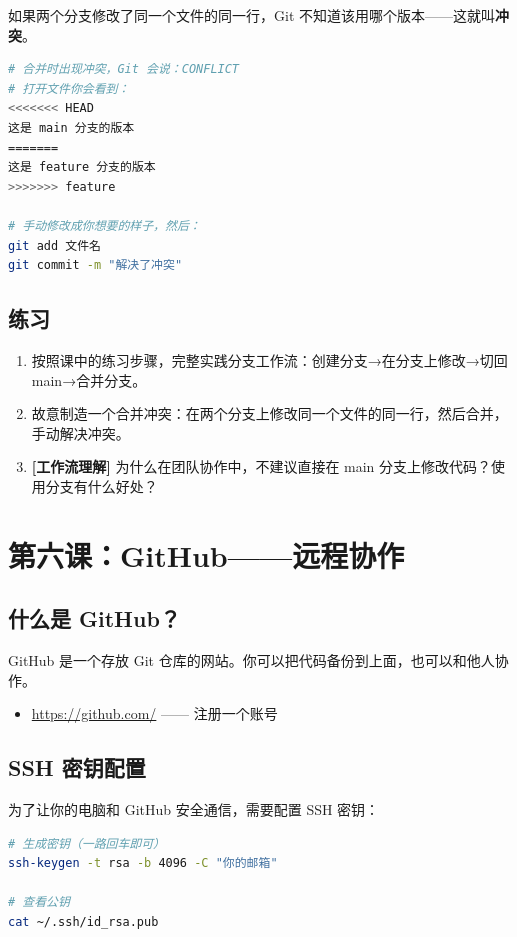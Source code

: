 \documentclass[a4paper,12pt]{ctexart}
\begin{document}
如果两个分支修改了同一个文件的同一行，Git 不知道该用哪个版本——这就叫\textbf{冲突}。

\begin{lstlisting}[language=bash]
# 合并时出现冲突，Git 会说：CONFLICT
# 打开文件你会看到：
<<<<<<< HEAD
这是 main 分支的版本
=======
这是 feature 分支的版本
>>>>>>> feature

# 手动修改成你想要的样子，然后：
git add 文件名
git commit -m "解决了冲突"
\end{lstlisting}

\subsection*{练习}

\begin{enumerate}
  \item 按照课中的练习步骤，完整实践分支工作流：创建分支→在分支上修改→切回 main→合并分支。
  \item 故意制造一个合并冲突：在两个分支上修改同一个文件的同一行，然后合并，手动解决冲突。
  \item \textbf{[工作流理解]} 为什么在团队协作中，不建议直接在 main 分支上修改代码？使用分支有什么好处？
\end{enumerate}

\section*{第六课：GitHub——远程协作}

\subsection*{什么是 GitHub？}

GitHub 是一个存放 Git 仓库的网站。你可以把代码备份到上面，也可以和他人协作。

\begin{itemize}
  \item \url{https://github.com/} —— 注册一个账号
\end{itemize}

\subsection*{SSH 密钥配置}

为了让你的电脑和 GitHub 安全通信，需要配置 SSH 密钥：

\begin{lstlisting}[language=bash]
# 生成密钥（一路回车即可）
ssh-keygen -t rsa -b 4096 -C "你的邮箱"

# 查看公钥
cat ~/.ssh/id_rsa.pub
\end{lstlisting}
\end{document}
